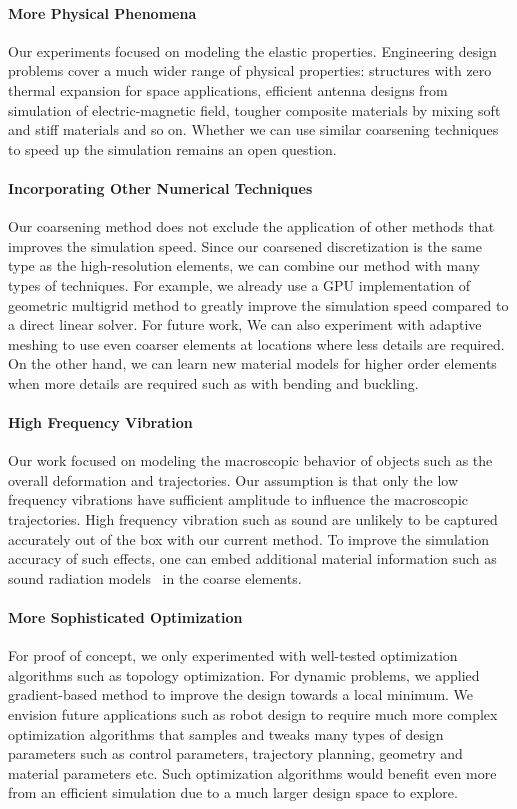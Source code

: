 \paragraph{More Physical Phenomena}
Our experiments focused on modeling the elastic properties.
Engineering design problems cover a much wider range of physical properties: structures with zero thermal expansion for space applications, 
efficient antenna designs from simulation of electric-magnetic field, 
tougher composite materials by mixing soft and stiff materials and so on.
Whether we can use similar coarsening techniques to speed up the simulation remains an open question.
\paragraph{Incorporating Other Numerical Techniques}
Our coarsening method does not exclude the application of other methods that improves the simulation speed.
Since our coarsened discretization is the same type as the high-resolution elements, we can combine our method with many types of techniques.
For example, we already use a GPU implementation of geometric multigrid method to greatly improve the simulation speed compared to a direct linear solver.
For future work,
We can also experiment with adaptive meshing to use even coarser elements at locations where less details are required. On the other hand, we can learn new material models for higher order elements when more details are required such as with bending and buckling.
\paragraph{High Frequency Vibration}
Our work focused on modeling the macroscopic behavior of objects such as the overall deformation and trajectories.
Our assumption is that only the low frequency vibrations have sufficient amplitude to influence the macroscopic trajectories.
High frequency vibration such as sound are unlikely to be captured accurately out of the box with our current method.
To improve the simulation accuracy of such effects, one can embed additional material information such as sound radiation models~\citep{schweickart2017animating} in the coarse elements.
\paragraph{More Sophisticated Optimization}
For proof of concept, we only experimented with well-tested optimization algorithms such as topology optimization. For dynamic problems, we applied gradient-based method to improve the design towards a local minimum.
We envision future applications such as robot design to require much more complex optimization algorithms that samples and tweaks many types of design parameters such as control parameters, trajectory planning, geometry and material parameters etc.
Such optimization algorithms would benefit even more from an efficient simulation due to a much larger design space to explore.
